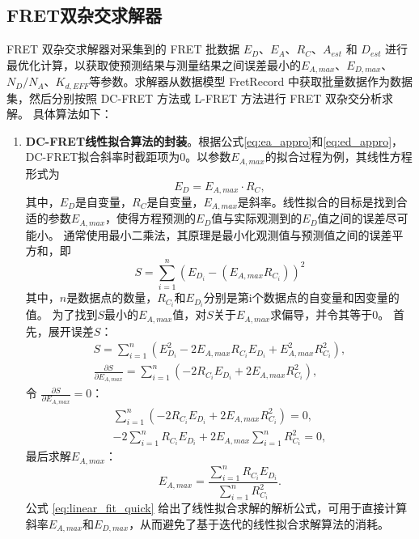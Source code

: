 \subsection{FRET双杂交求解器}
FRET 双杂交求解器对采集到的 FRET 批数据 $E_D$、$E_A$、$R_C$、$A_{est}$ 和 $D_{est}$ 进行最优化计算，以获取使预测结果与测量结果之间误差最小的$E_{A,max}$、$E_{D,max}$、$N_D / N_A$、$K_{d,EFF}$等参数。求解器从数据模型 FretRecord 中获取批量数据作为数据集，然后分别按照 DC-FRET 方法或 L-FRET 方法进行 FRET 双杂交分析求解。
具体算法如下：
\begin{enumerate}
  \item \textbf{DC-FRET线性拟合算法的封装}。根据公式\ref{eq:ea_appro}和\ref{eq:ed_appro}，DC-FRET拟合斜率时截距项为0。以参数$E_{A,max}$的拟合过程为例，其线性方程形式为
  \begin{equation}
      E_D = E_{A,max}\cdot R_C,
  \end{equation}
  其中，$E_D$是自变量，$R_C$是自变量，$E_{A,max}$是斜率。线性拟合的目标是找到合适的参数$E_{A,max}$，使得方程预测的$E_D$值与实际观测到的$E_D$值之间的误差尽可能小。
  通常使用最小二乘法，其原理是最小化观测值与预测值之间的误差平方和，即
  \begin{equation}
      S=\sum^{n}_{i=1}(E_{D_i}-(E_{A,max}R_{C_i}))^2
  \end{equation}
  其中，$n$是数据点的数量，$R_{C_i}$和$E_{D_i}$分别是第i个数据点的自变量和因变量的值。
  为了找到$S$最小的$E_{A,max}$值，对$S$关于$E_{A,max}$求偏导，并令其等于0。
  首先，展开误差$S$：
  \begin{align}
       S=\sum_{i = 1}^{n}(E_{D_i}^{2}-2E_{A,max}R_{C_i}E_{D_i} + E_{A,max}^{2}R_{C_i}^{2}), \\
       \frac{\partial S}{\partial E_{A,max}}=\sum_{i = 1}^{n}(-2R_{C_i}E_{D_i} + 2E_{A,max}R_{C_i}^{2}),
  \end{align}
  令 \(\frac{\partial S}{\partial E_{A,max}}=0\)：
  \begin{align}
       \sum_{i = 1}^{n}(-2R_{C_i}E_{D_i} + 2E_{A,max}R_{C_i}^{2}) = 0, \\
      -2\sum_{i = 1}^{n}R_{C_i}E_{D_i}+2E_{A,max}\sum_{i = 1}^{n}R_{C_i}^{2}=0,
  \end{align}
  最后求解$E_{A,max}$：
  \begin{equation}
         E_{A,max}=\frac{\sum_{i = 1}^{n}R_{C_i}E_{D_i}}{\sum_{i = 1}^{n}R_{C_i}^{2}}. \label{eq:linear_fit_quick}
  \end{equation}
  公式 \ref{eq:linear_fit_quick} 给出了线性拟合求解的解析公式，可用于直接计算斜率$E_{A,max}$和$E_{D,max}$，从而避免了基于迭代的线性拟合求解算法的消耗。


\end{enumerate}
